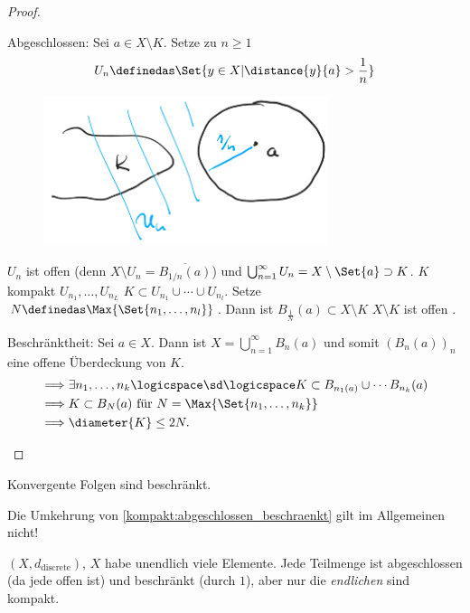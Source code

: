 \begin{proof}
    \begin{proofdescription}
        \item[Abgeschlossen:] Sei \( a\in X\setminus K\). Setze zu \( n\geq 1\)
        \begin{align*}
            U_n\definedas \Set{y\in X| \distance{y}{a}>\frac{1}{n}}
        \end{align*}  
        \begin{figure}[H]
            \centering
            \includegraphics[width=0.5\linewidth]{figures/kompakt_abgeschlossen_beweis}
            \label{fig:kompakt_abgeschlossen_beweis}
        \end{figure}
        \( U_n\) ist offen (denn \( X\setminus U_n=\overline{B_{1/n}(a)}\)) und \( \bigcup_{n=1}^{\infty}U_n=X\setminus \Set{a}\supset K\).
        \( K\) kompakt \timplies \texists \( U_{n_1},\ldots, U_{n_L}\) \sd \( K\subset U_{n_1}\cup \cdots \cup U_{n_l}\). Setze \( N\definedas \Max{\Set{n_1,\ldots,n_l}}\). Dann ist \( B_{\frac{1}{N}}(a)\subset X\setminus K\) \timplies \( X\setminus K \) ist offen \timplies \Beh.
        
        \item[Beschränktheit:] Sei \( a\in X\). Dann ist \( X=\bigcup\limits_{n=1}^{\infty} B_n(a) \) und somit \( (B_n(a))_n\) eine offene Überdeckung von \( K\).
        \begin{align*}
            \implies &\exists n_1,\ldots, n_k\logicspace\text{\sd}\logicspace  K\subset B_{n_1(a)}\cup \cdots B_{n_k}(a)\\
            \implies &K\subset B_N(a) \text{ für }N=\Max{\Set{n_1,\ldots,n_k}}\\
            \implies &\diameter{K}\leq 2N.
        \end{align*}     
    \end{proofdescription}    
\end{proof}
\begin{folgerung*}
    Konvergente Folgen sind beschränkt.
\end{folgerung*}
\begin{bemerkung*}
    Die Umkehrung von \ref{kompakt:abgeschlossen_beschraenkt} gilt im Allgemeinen nicht!
    
    \( (X,d_{\text{discrete}})\), \( X\) habe unendlich viele Elemente. Jede Teilmenge ist abgeschlossen (da jede offen ist) und beschränkt (durch \( 1\)), aber nur die \emph{endlichen} sind kompakt.
\end{bemerkung*}
